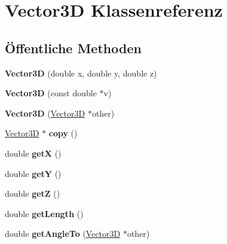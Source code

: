 \hypertarget{classVector3D}{\section{Vector3\-D Klassenreferenz}
\label{classVector3D}
}
\subsection*{Öffentliche Methoden}
\begin{DoxyCompactItemize}
\item 
\hypertarget{classVector3D_abd851542da40b1168edcad11fa83b7c2}{{\bfseries Vector3\-D} (double x, double y, double z)}\label{classVector3D_abd851542da40b1168edcad11fa83b7c2}

\item 
\hypertarget{classVector3D_a69bb755408c9dc5892362f0ff15fee5f}{{\bfseries Vector3\-D} (const double $\ast$v)}\label{classVector3D_a69bb755408c9dc5892362f0ff15fee5f}

\item 
\hypertarget{classVector3D_a010bd55f41a082eccb1a7f513db29e69}{{\bfseries Vector3\-D} (\hyperlink{classVector3D}{Vector3\-D} $\ast$other)}\label{classVector3D_a010bd55f41a082eccb1a7f513db29e69}

\item 
\hypertarget{classVector3D_a46dd0d9a849809a3857783102959e788}{\hyperlink{classVector3D}{Vector3\-D} $\ast$ {\bfseries copy} ()}\label{classVector3D_a46dd0d9a849809a3857783102959e788}

\item 
\hypertarget{classVector3D_aa9eaf29045bf32b95c5c7bcb2b8b68d7}{double {\bfseries get\-X} ()}\label{classVector3D_aa9eaf29045bf32b95c5c7bcb2b8b68d7}

\item 
\hypertarget{classVector3D_aa3ffff17b886274a58417dfe4bb4c4a2}{double {\bfseries get\-Y} ()}\label{classVector3D_aa3ffff17b886274a58417dfe4bb4c4a2}

\item 
\hypertarget{classVector3D_ab0dcbf253ff78856eccb5ea74d080fc7}{double {\bfseries get\-Z} ()}\label{classVector3D_ab0dcbf253ff78856eccb5ea74d080fc7}

\item 
\hypertarget{classVector3D_a2e3aa1d244483abcb1a8e48e47e79512}{double {\bfseries get\-Length} ()}\label{classVector3D_a2e3aa1d244483abcb1a8e48e47e79512}

\item 
\hypertarget{classVector3D_a4bf1dcea68296f2f38f3574242933153}{double {\bfseries get\-Angle\-To} (\hyperlink{classVector3D}{Vector3\-D} $\ast$other)}\label{classVector3D_a4bf1dcea68296f2f38f3574242933153}


\end{DoxyCompactItemize}

